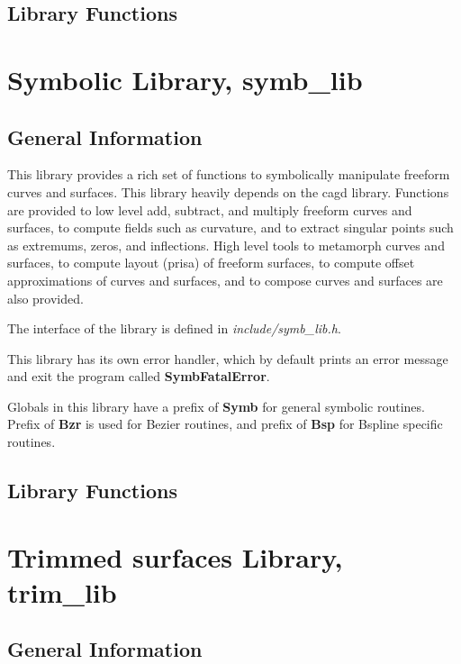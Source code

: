 {\section{Library Functions}


\chapter{Symbolic Library, symb\_lib}

\section{General Information}

This library provides a rich set of functions to symbolically manipulate
freeform curves and surfaces. This library heavily depends on the cagd
library. Functions are provided to low level add, subtract, and multiply
freeform curves and surfaces, to compute fields such as curvature,
and to extract singular points such as extremums, zeros, and inflections.
High level tools to metamorph curves and surfaces, to compute layout (prisa)
of freeform surfaces, to compute offset approximations of curves and
surfaces, and to compose curves and surfaces are also provided.

The interface of the library is defined in {\em include/symb\_lib.h}. 

This library has its own error handler, which by default prints an
error message and exit the program called {\bf SymbFatalError}.

Globals in this library have a prefix of {\bf Symb} for general
symbolic routines. Prefix of {\bf Bzr} is used for Bezier routines,
and prefix of {\bf Bsp} for Bspline specific routines.

\section{Library Functions}


\chapter{Trimmed surfaces Library, trim\_lib}

\section{General Information}

}
